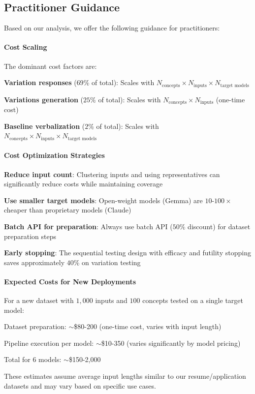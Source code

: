 \subsection{Practitioner Guidance}

Based on our analysis, we offer the following guidance for practitioners:

\paragraph{Cost Scaling} The dominant cost factors are:
\begin{compactitem}
    \item \textbf{Variation responses} ($69$\% of total): Scales with $N_{\text{concepts}} \times N_{\text{inputs}} \times N_{\text{target models}}$
    \item \textbf{Variations generation} ($25$\% of total): Scales with $N_{\text{concepts}} \times N_{\text{inputs}}$ (one-time cost)
    \item \textbf{Baseline verbalization} ($2$\% of total): Scales with $N_{\text{concepts}} \times N_{\text{inputs}} \times N_{\text{target models}}$
\end{compactitem}

\paragraph{Cost Optimization Strategies}
\begin{compactenum}
    \item \textbf{Reduce input count}: Clustering inputs and using representatives can significantly reduce costs while maintaining coverage
    \item \textbf{Use smaller target models}: Open-weight models (Gemma) are $10$-$100\times$ cheaper than proprietary models (Claude)
    \item \textbf{Batch API for preparation}: Always use batch API ($50$\% discount) for dataset preparation steps
    \item \textbf{Early stopping}: The sequential testing design with efficacy and futility stopping saves approximately $40$\% on variation testing
\end{compactenum}

\paragraph{Expected Costs for New Deployments} For a new dataset with $1{,}000$ inputs and $100$ concepts tested on a single target model:
\begin{compactitem}
    \item Dataset preparation: $\sim$\$80-200 (one-time cost, varies with input length)
    \item Pipeline execution per model: $\sim$\$10-350 (varies significantly by model pricing)
    \item Total for 6 models: $\sim$\$150-2,000
\end{compactitem}

These estimates assume average input lengths similar to our resume/application datasets and may vary based on specific use cases.
